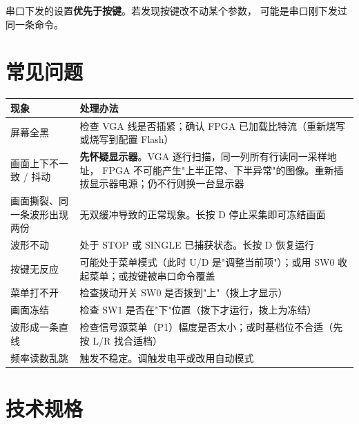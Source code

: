 \documentclass[UTF8,a4paper,11pt]{ctexart}
\begin{document}
\begin{tipbox}
串口下发的设置\textbf{优先于按键}。若发现按键改不动某个参数，
可能是串口刚下发过同一条命令。
\end{tipbox}

\section{常见问题}

\begin{center}
\small
\begin{tabular}{p{5.2cm}p{9.2cm}}
\toprule
现象 & 处理办法\\
\midrule
屏幕全黑 & 检查 VGA 线是否插紧；确认 FPGA 已加载比特流（重新烧写或烧写到配置 Flash）\\
画面上下不一致 / 抖动 & \textbf{先怀疑显示器}。VGA 逐行扫描，同一列所有行读同一采样地址，
FPGA 不可能产生"上半正常、下半异常"的图像。重新插拔显示器电源；仍不行则换一台显示器\\
画面撕裂、同一条波形出现两份 & 无双缓冲导致的正常现象。长按 D 停止采集即可冻结画面\\
波形不动 & 处于 STOP 或 SINGLE 已捕获状态。长按 D 恢复运行\\
按键无反应 & 可能处于菜单模式（此时 U/D 是"调整当前项"）；或用 SW0 收起菜单；或按键被串口命令覆盖\\
菜单打不开 & 检查拨动开关 SW0 是否拨到"上"（拨上才显示）\\
画面冻结 & 检查 SW1 是否在"下"位置（拨下才运行，拨上为冻结）\\
波形成一条直线 & 检查信号源菜单（P1）幅度是否太小；或时基档位不合适（先按 L/R 找合适档）\\
频率读数乱跳 & 触发不稳定。调触发电平或改用自动模式\\
\bottomrule
\end{tabular}
\end{center}

\appendix
\section{技术规格}
\end{document}
